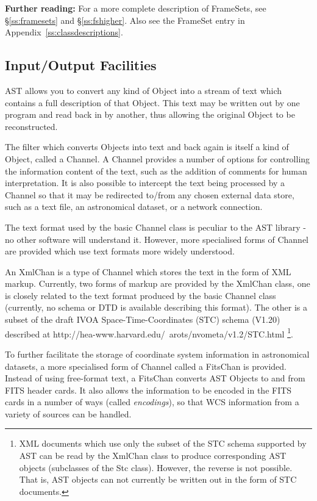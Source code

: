 \documentclass[twoside,11pt]{article}
\newcommand{\htmladdnormallink}[2]{#1}
\newcommand{\appref}[1]{Appendix~\ref{#1}}
\newcommand{\secref}[1]{\S\ref{#1}}
\newcommand{\appref}[1]{\ref{#1}}
\newcommand{\secref}[1]{\ref{#1}}
\begin{document}
{\bf{Further reading:}} For a more complete description of
FrameSets, see \secref{ss:framesets} and \secref{ss:fshigher}. Also
see the FrameSet entry in \appref{ss:classdescriptions}.

\subsection{Input/Output Facilities}

AST allows you to convert any kind of Object into a stream of text
which contains a full description of that Object. This text may be
written out by one program and read back in by another, thus allowing
the original Object to be reconstructed.

The filter which converts Objects into text and back again is itself a
kind of Object, called a Channel. A Channel provides a number of
options for controlling the information content of the text, such as
the addition of comments for human interpretation.  It is also
possible to intercept the text being processed by a Channel so that it
may be redirected to/from any chosen external data store, such as a
text file, an astronomical dataset, or a network connection.

The text format used by the basic Channel class is peculiar to the AST
library - no other software will understand it. However, more specialised 
forms of Channel are provided which use text formats more widely
understood.

An XmlChan is a type of Channel which stores the text in the form of 
XML markup. Currently, two forms of markup are provided by the XmlChan
class, one is closely related to the text format produced by the basic Channel 
class (currently, no schema or DTD is available describing this format). 
The other is a subset of the draft IVOA Space-Time-Coordinates (STC) schema
(V1.20) described at \htmladdnormallink{
http://hea-www.harvard.edu/~arots/nvometa/v1.2/STC.html 
}{
http://hea-www.harvard.edu/~arots/nvometa/v1.2/STC.html 
}\footnote{XML documents which use only the subset of the STC schema
supported by AST can be read by the XmlChan class to produce corresponding 
AST objects (subclasses of the Stc class). However, the reverse is not
possible. That is, AST objects can not currently be written out in the 
form of STC documents.}.

To further facilitate the storage of coordinate system information in
astronomical datasets, a more specialised form of Channel called a
FitsChan is provided. Instead of using free-format text, a FitsChan
converts AST Objects to and from FITS header cards. It also allows the
information to be encoded in the FITS cards in a number of ways
(called {\em{encodings}}), so that WCS information from a variety of
sources can be handled.
\end{document}
